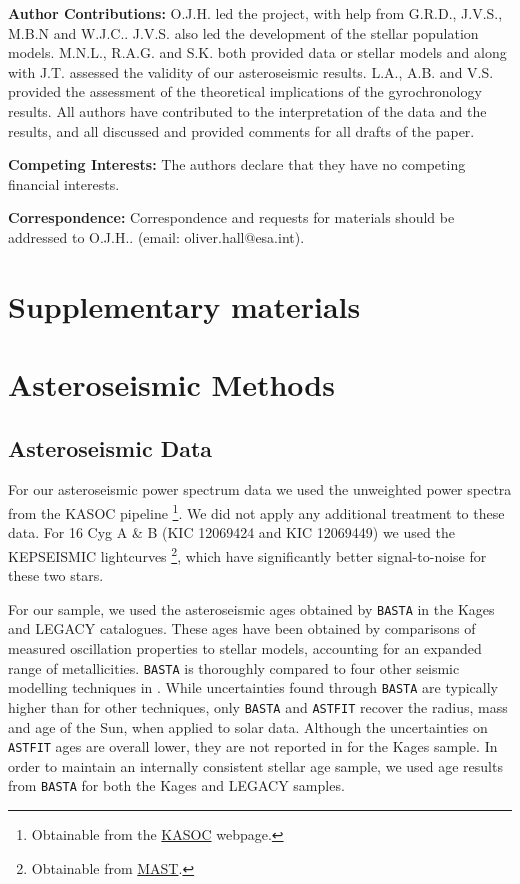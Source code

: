 \documentclass[12pt]{article}
\begin{document}


\textbf{Author Contributions:} O.J.H. led the project, with help from G.R.D., J.V.S., M.B.N and W.J.C.. J.V.S. also led the development of the stellar population models. M.N.L., R.A.G. and S.K. both provided data or stellar models and along with J.T. assessed the validity of our asteroseismic results. L.A., A.B. and V.S. provided the assessment of the theoretical implications of the gyrochronology results. All authors have contributed to the interpretation of the data and the results, and all discussed and provided comments for all drafts of the paper.

\textbf{Competing Interests:} The authors declare that they have no competing financial interests.

\textbf{Correspondence:} Correspondence and requests for materials should be addressed to O.J.H.. (email: oliver.hall@esa.int).

\clearpage

\section*{Supplementary materials}
\setcounter{tocdepth}{2}
\tableofcontents
\section{Asteroseismic Methods}
\subsection{Asteroseismic Data}
For our asteroseismic power spectrum data we used the unweighted power spectra from the KASOC pipeline \cite{handberg+lund2014}\footnote{Obtainable from the \href{http://kasoc.phys.au.dk/}{KASOC} webpage.}. We did not apply any additional treatment to these data. For 16 Cyg A \& B (KIC 12069424 and KIC 12069449) we used the KEPSEISMIC lightcurves \cite{garcia+2011}\footnote{Obtainable from \href{https://archive.
		stsci.edu/prepds/kepseismic/}{MAST}.}, which have significantly better signal-to-noise for these two stars.

For our sample, we used the asteroseismic ages obtained by \texttt{BASTA} \cite[BAyesian STellar Algorithm]{silvaaguirre+2015} in the Kages and LEGACY catalogues. These ages have been obtained by comparisons of measured oscillation properties to stellar models, accounting for an expanded range of metallicities. \texttt{BASTA} is thoroughly compared to four other seismic modelling techniques in \cite{silvaaguirre+2017}. While uncertainties found through \texttt{BASTA} are typically higher than for other techniques, only \texttt{BASTA} and \texttt{ASTFIT} \cite[Aarhus STellar Evolution Code]{christensen-dalsgaard2008} recover the radius, mass and age of the Sun, when applied to solar data. Although the uncertainties on \texttt{ASTFIT} ages are overall lower, they are not reported in \cite{silvaaguirre+2015} for the Kages sample. In order to maintain an internally consistent stellar age sample, we used age results from \texttt{BASTA} for both the Kages and LEGACY samples.
\end{document}
